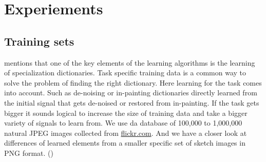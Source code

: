 \chapter{Experiements}

\section{Training sets}
 mentions that one of the key
elements of the learning algorithms is the learning of specialization
dictionaries. Task specific training data is a common way to solve the problem
of finding  the right dictionary. Here learning for the task comes into
account. Such as de-noising or in-painting dictionaries directly learned from
the initial signal that gets de-noised or restored from in-painting. If the task
gets bigger it sounds logical to increase the size of training data and take a
bigger variety of signals to learn from.  We use da database of 100,000
to 1,000,000 natural JPEG images collected from \url{flickr.com}. And we have a
closer look at differences of learned elements from a smaller specific set of
sketch images in PNG format. ()

